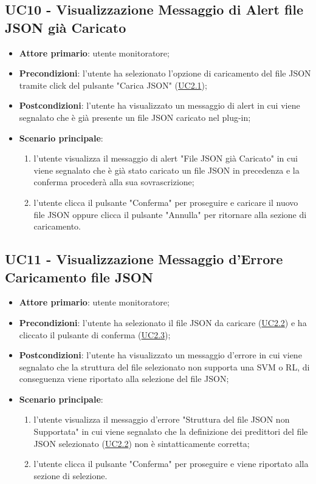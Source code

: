 
	\label{par:UC10}
	\subsection{UC10 - Visualizzazione Messaggio di Alert file JSON già Caricato}
		\begin{itemize}
			\item\textbf{Attore primario}: utente monitoratore;
			\item\textbf{Precondizioni}: l’utente ha selezionato l'opzione di caricamento del file JSON tramite click del pulsante "Carica JSON" (\hyperref[par:UC2.1]{UC2.1});
			\item\textbf{Postcondizioni}: l’utente ha visualizzato un messaggio di alert in cui viene segnalato che è già presente un file JSON caricato nel plug-in;
			\item\textbf{Scenario principale}:
				\begin{enumerate}
					\item l’utente visualizza il messaggio di alert "File JSON già Caricato" in cui viene segnalato che è già stato caricato un file JSON in precedenza e la conferma procederà alla sua sovrascrizione;
					\item l'utente clicca il pulsante "Conferma" per proseguire e caricare il nuovo file JSON oppure clicca il pulsante "Annulla" per ritornare alla sezione di caricamento.
				\end{enumerate}
		\end{itemize}	


	\label{par:UC11}
	\subsection{UC11 - Visualizzazione Messaggio d'Errore Caricamento file JSON }
		\begin{itemize}
			\item\textbf{Attore primario}: utente monitoratore;
			\item\textbf{Precondizioni}: l’utente ha selezionato il file JSON da caricare (\hyperref[par:UC2.2]{UC2.2}) e ha cliccato il pulsante di conferma (\hyperref[par:UC2.3]{UC2.3});
			\item\textbf{Postcondizioni}: l’utente ha visualizzato un messaggio d'errore in cui viene segnalato che la struttura del file selezionato non supporta una SVM o RL, di conseguenza viene riportato alla selezione del file JSON;
			\item\textbf{Scenario principale}:
				\begin{enumerate}
					\item l’utente visualizza il messaggio d'errore "Struttura del file JSON non Supportata" in cui viene segnalato che la definizione dei predittori del file JSON selezionato (\hyperref[par:UC2.2]{UC2.2}) non è sintatticamente corretta;
					\item l'utente clicca il pulsante "Conferma" per proseguire e viene riportato alla sezione di selezione.
				\end{enumerate}
		\end{itemize}	

